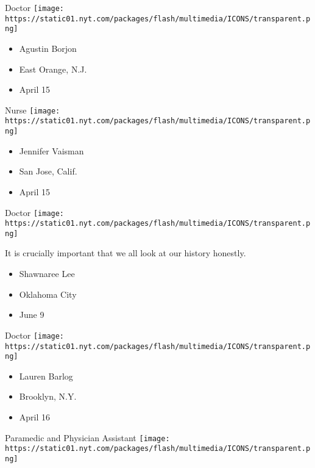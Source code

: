 \protect\hyperlink{item-agustin-borjon}{}

Doctor
\texttt{[image: https://static01.nyt.com/packages/flash/multimedia/ICONS/transparent.png]}

\begin{itemize}
\tightlist
\item
  Agustin Borjon
\item
  East Orange, N.J.
\item
  April 15
\end{itemize}

\protect\hyperlink{item-jennifer-vaisman}{}

Nurse
\texttt{[image: https://static01.nyt.com/packages/flash/multimedia/ICONS/transparent.png]}

\begin{itemize}
\tightlist
\item
  Jennifer Vaisman
\item
  San Jose, Calif.
\item
  April 15
\end{itemize}

\protect\hyperlink{item-shawnaree-lee}{}

Doctor
\texttt{[image: https://static01.nyt.com/packages/flash/multimedia/ICONS/transparent.png]}

It is crucially important that we all look at our history honestly.

\begin{itemize}
\tightlist
\item
  Shawnaree Lee
\item
  Oklahoma City
\item
  June 9
\end{itemize}

\protect\hyperlink{item-lauren-barlog}{}

Doctor
\texttt{[image: https://static01.nyt.com/packages/flash/multimedia/ICONS/transparent.png]}

\begin{itemize}
\tightlist
\item
  Lauren Barlog
\item
  Brooklyn, N.Y.
\item
  April 16
\end{itemize}

\protect\hyperlink{item-eric-m-thomas}{}

Paramedic and Physician Assistant
\texttt{[image: https://static01.nyt.com/packages/flash/multimedia/ICONS/transparent.png]}

